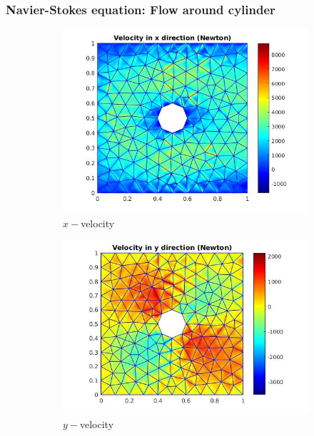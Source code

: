 \documentclass{beamer}
\begin{document}
\begin{frame}
\frametitle{Navier-Stokes equation: Flow around cylinder}
\begin{figure}
  \begin{subfigure}{0.3\textwidth}
    \includegraphics[width=\linewidth]{cylinder_newton_vx_schur.jpg}
    \caption{$x-$velocity}
  \label{x_vel_navier_stoke_schur}
  \end{subfigure}
  \begin{subfigure}{0.3\textwidth}
    \includegraphics[width=\linewidth]{cylinder_newton_vy_schur.jpg}
    \caption{$y-$velocity}
  \label{y_vel_navier_stoke_schur}
  \end{subfigure}
  \begin{subfigure}{0.3\textwidth}

\end{subfigure}
\end{figure}
\end{frame}
\end{document}
